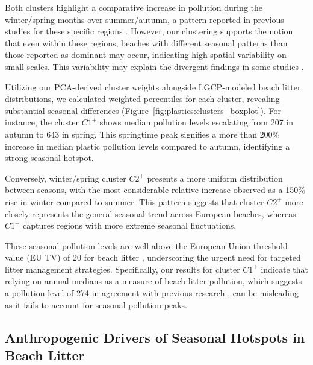 Both clusters highlight a comparative increase in pollution during the winter/spring months over summer/autumn, a pattern reported in previous studies for these specific regions \cite{svard_analys_2013,kanstrup_plastic_2018,le_moigne_cleanatlantic_2021, gago_characteristics_2014,declerck_transport_2019,ruiz_modelling_2022,schulz_multi-criteria_2013}. However, our clustering supports the notion that even within these regions, beaches with different seasonal patterns than those reported as dominant may occur, indicating high spatial variability on small scales. This variability may explain the divergent findings in some studies \cite{schulz_multi-criteria_2013,gago_characteristics_2014,watts_through_2017,rios_spatio-temporal_2018,asensio-montesinos_seasonal_2019,ruiz_modelling_2022}.

Utilizing our PCA-derived cluster weights alongside LGCP-modeled beach litter distributions, we calculated weighted percentiles for each cluster, revealing substantial seasonal differences (Figure~\ref{fig:plastics:clusters_boxplot}). For instance, the cluster $C1^+$ shows median pollution levels escalating from 207 \itm{} in autumn to 643 \itm{} in spring. This springtime peak signifies a more than 200\% increase in median plastic pollution levels compared to autumn, identifying a strong seasonal hotspot. 

Conversely, winter/spring cluster $C2^+$ presents a more uniform distribution between seasons, with the most considerable relative increase observed as a 150\% rise in winter compared to summer. This pattern suggests that cluster $C2^+$ more closely represents the general seasonal trend across European beaches, whereas $C1^+$ captures regions with more extreme seasonal fluctuations.

These seasonal pollution levels are well above the European Union threshold value (EU TV) of 20 \itm{} for beach litter \cite{van_loon_european_2020}, underscoring the urgent need for targeted litter management strategies. Specifically, our results for cluster $C1^+$ indicate that relying on annual medians as a measure of beach litter pollution, which suggests a pollution level of 274 \itm{} in agreement with previous research \cite{schulz_baseline_2019,hanke_eu_2019, van_loon_european_2020,lacroix_abundance_2023}, can be misleading as it fails to account for seasonal pollution peaks.


\subsection{Anthropogenic Drivers of Seasonal Hotspots in Beach Litter}

